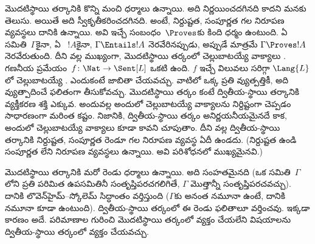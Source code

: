 \documentclass[../../../include/open-logic-section]{subfiles}
\begin{document}


మొదటిస్థాయి తర్కానికి కొన్ని మంచి ధర్మాలు ఉన్నాయి. అది
నిర్ణయించదగినది కాదని మనకు తెలుసు. అయితే అది స్వీకృతీకరించదగినది.
అంటే, నిర్దుష్టత, సంపూర్ణత గల నిరూపణ వ్యవస్థలు దానికి ఉన్నాయి.
అవి ఇచ్చే  సంబంధం~$\Proves$కు కింది ధర్మం
ఉంటుంది. ఏ  సమితి~$\Gamma$కైనా, ఏ ~$!A$కైనా,
$\Gamma \Entails !A$ నెరవేరినప్పుడు, అప్పుడే మాత్రమే $\Gamma \Proves !A$ నెరవేరుతుంది.
దీని వల్ల ముఖ్యంగా, మొదటిస్థాయి తర్కంలో చెల్లుబాటయ్యే వాక్యాలు . గణనీయ ప్రమేయం~$f\colon \Nat \to
\Sent[L]$ ఒకటి ఉంది. $f$ ఇచ్చే విలువలు సరిగ్గా
$\Lang{L}$లో చెల్లుబాటయ్యే . ఎందుకంటే
 జాబితా చేయవచ్చు. వాటిలో ఒక్క 
 ప్రతి వ్యుత్పత్తికీ, అది వ్యుత్పాదించే 
ఫలితంగా తీసుకోవచ్చు. మొదటిస్థాయి తర్కం కంటే ద్వితీయ-స్థాయి తర్కానికి
వ్యక్తీకరణ శక్తి ఎక్కువ. అందువల్ల అందులో చెల్లుబాటయ్యే వాక్యాలను
నిర్దిష్టంగా చెప్పడం సాధారణంగా మరింత కష్టం. నిజానికి,
ద్వితీయ-స్థాయి తర్కం అనిర్ణయనీయమైనదే కాక, అందులో చెల్లుబాటయ్యే వాక్యాలు
 కూడా కావని చూపుతాం. దీని వల్ల ద్వితీయ-స్థాయి తర్కానికి
నిర్దుష్టత, సంపూర్ణత రెండూ గల నిరూపణ వ్యవస్థ ఏదీ ఉండదు. (నిర్దుష్టత
ఉండి సంపూర్ణత లేని నిరూపణ వ్యవస్థలు ఉన్నాయి. అవి పరిశోధనలో ముఖ్యమైనవి.)

మొదటిస్థాయి తర్కానికి మరో రెండు ధర్మాలు ఉన్నాయి. అది సంహతమైనది
(ఒక  సమితి~$\Gamma$లోని ప్రతి పరిమిత ఉపసమితినీ
సంతృప్తిపరచగలిగితే, $\Gamma$ మొత్తాన్నీ సంతృప్తిపరచవచ్చు). దానికి
లొవెన్‌హైమ్--స్కోలెమ్ సిద్ధాంతం వర్తిస్తుంది ($\Gamma$కు అనంత నమూనా
ఉంటే, దానికి  నమూనా కూడా ఉంటుంది).
ద్వితీయ-స్థాయి తర్కంలో ఈ రెండు ఫలితాలూ వర్తించవు. ఇక్కడా కారణం
అదే.  పరిమాణాల గురించి మొదటిస్థాయి తర్కంలో
వ్యక్తం చేయలేని విషయాలను ద్వితీయ-స్థాయి తర్కంలో వ్యక్తం చేయవచ్చు.
\end{document}
